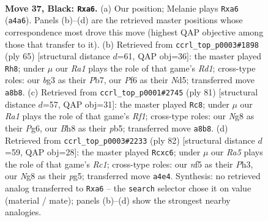 \documentclass[11pt]{article}
\begin{document}
\clearpage

\begin{figure}[p]\centering
\begin{subfigure}{0.46\textwidth}\centering
\resizebox{\linewidth}{!}{%
\newchessgame
\chessboard[
  setfen={r1k3nb/p6p/P1p2p2/2P2N2/r3P3/3R2B1/8/3R2K1 b - - 5 37},
  showmover=false,
  pgfstyle=straightmove, color=movearrow, markmove={a4-a6}
]}
\caption{}
\end{subfigure}\hfill
\begin{subfigure}{0.46\textwidth}\centering
\resizebox{\linewidth}{!}{%
\newchessgame
\chessboard[
  setfen={2kr4/1p6/p4p2/3n4/3P2rp/8/PP1BR1P1/5R1K b - - 1 33},
  showmover=false,
  pgfstyle=straightmove, color=movearrow, markmove={d8-h8}
]}
\caption{}
\end{subfigure}
\\[4pt]
\begin{subfigure}{0.46\textwidth}\centering
\resizebox{\linewidth}{!}{%
\newchessgame
\chessboard[
  setfen={5r1k/8/6pp/1PP1r3/3pp1P1/3p3P/5P2/2RR2K1 b - - 2 41},
  showmover=false,
  pgfstyle=straightmove, color=movearrow, markmove={f8-c8}
]}
\caption{}
\end{subfigure}\hfill
\begin{subfigure}{0.46\textwidth}\centering
\resizebox{\linewidth}{!}{%
\newchessgame
\chessboard[
  setfen={8/3k4/R1p3pp/6p1/P3P3/7P/1r1r2P1/2R4K w - - 3 42},
  showmover=false,
  pgfstyle=straightmove, color=movearrow, markmove={c1-c6}
]}
\caption{}
\end{subfigure}
\caption{\textbf{Move 37, Black: \texttt{Rxa6}.} (a) Our position; Melanie plays \texttt{Rxa6} (\texttt{a4a6}). Panels (b)--(d) are the retrieved master positions whose correspondence most drove this move (highest QAP objective among those that transfer to it). (b) Retrieved from \texttt{ccrl\_top\_p0003\#1898} (ply 65) [structural distance $d$=61, QAP obj=36]: the master played \texttt{Rh8}; under $\mu$ our \emph{Ra1} plays the role of that game's \emph{Rd1}; cross-type roles: our \emph{b}g3 as their \emph{P}b7, our \emph{P}f6 as their \emph{N}d5; transferred move \texttt{a8b8}. (c) Retrieved from \texttt{ccrl\_top\_p0001\#2745} (ply 81) [structural distance $d$=57, QAP obj=31]: the master played \texttt{Rc8}; under $\mu$ our \emph{Ra1} plays the role of that game's \emph{Rf1}; cross-type roles: our \emph{N}g8 as their \emph{P}g6, our \emph{B}h8 as their \emph{p}b5; transferred move \texttt{a8b8}. (d) Retrieved from \texttt{ccrl\_top\_p0003\#2233} (ply 82) [structural distance $d$=59, QAP obj=28]: the master played \texttt{Rcxc6}; under $\mu$ our \emph{Ra5} plays the role of that game's \emph{Rc1}; cross-type roles: our \emph{n}f5 as their \emph{P}h3, our \emph{N}g8 as their \emph{p}g5; transferred move \texttt{a4e4}. Synthesis: no retrieved analog transferred to \texttt{Rxa6} -- the \texttt{search} selector chose it on value (material / mate); panels (b)--(d) show the strongest nearby analogies.}
\label{fig:thought-m73}
\end{figure}
\end{document}
